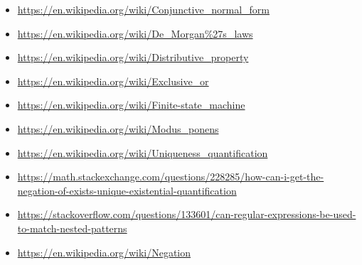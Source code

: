 \documentclass[a4paper, 14pt]{report}
\begin{document}
\begin{flushleft}
	\begin{itemize}[noitemsep]
		\item \url{https://en.wikipedia.org/wiki/Conjunctive_normal_form}
		\item \url{https://en.wikipedia.org/wiki/De_Morgan\%27s_laws}
		\item \url{https://en.wikipedia.org/wiki/Distributive_property}
		\item \url{https://en.wikipedia.org/wiki/Exclusive_or}
		\item \url{https://en.wikipedia.org/wiki/Finite-state_machine}
		\item \url{https://en.wikipedia.org/wiki/Modus_ponens}
		\item \url{https://en.wikipedia.org/wiki/Uniqueness_quantification}
		\item \url{https://math.stackexchange.com/questions/228285/how-can-i-get-the-negation-of-exists-unique-existential-quantification}
		\item \url{https://stackoverflow.com/questions/133601/can-regular-expressions-be-used-to-match-nested-patterns}
		\item \url{https://en.wikipedia.org/wiki/Negation}
	\end{itemize}		
\end{flushleft}
\end{document}
